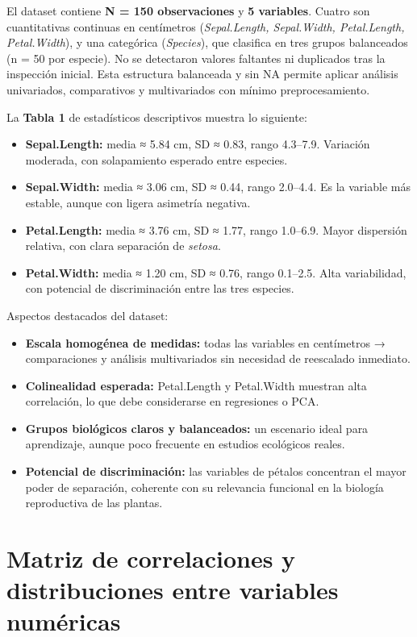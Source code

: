 \documentclass[
  spanish,
  11pt,
  a4paper,
  DIV=11,
  numbers=noendperiod]{scrartcl}
\begin{document}
El dataset contiene \textbf{N = 150 observaciones} y \textbf{5
variables}. Cuatro son cuantitativas continuas en centímetros
(\emph{Sepal.Length, Sepal.Width, Petal.Length, Petal.Width}), y una
categórica (\emph{Species}), que clasifica en tres grupos balanceados (n
= 50 por especie). No se detectaron valores faltantes ni duplicados tras
la inspección inicial. Esta estructura balanceada y sin NA permite
aplicar análisis univariados, comparativos y multivariados con mínimo
preprocesamiento.

La \textbf{Tabla 1} de estadísticos descriptivos muestra lo siguiente:

\begin{itemize}
\item
  \textbf{Sepal.Length:} media ≈ 5.84 cm, SD ≈ 0.83, rango 4.3--7.9.
  Variación moderada, con solapamiento esperado entre especies.
\item
  \textbf{Sepal.Width:} media ≈ 3.06 cm, SD ≈ 0.44, rango 2.0--4.4. Es
  la variable más estable, aunque con ligera asimetría negativa.
\item
  \textbf{Petal.Length:} media ≈ 3.76 cm, SD ≈ 1.77, rango 1.0--6.9.
  Mayor dispersión relativa, con clara separación de \emph{setosa}.
\item
  \textbf{Petal.Width:} media ≈ 1.20 cm, SD ≈ 0.76, rango 0.1--2.5. Alta
  variabilidad, con potencial de discriminación entre las tres especies.
\end{itemize}

Aspectos destacados del dataset:

\begin{itemize}
\item
  \textbf{Escala homogénea de medidas:} todas las variables en
  centímetros → comparaciones y análisis multivariados sin necesidad de
  reescalado inmediato.
\item
  \textbf{Colinealidad esperada:} Petal.Length y Petal.Width muestran
  alta correlación, lo que debe considerarse en regresiones o PCA.
\item
  \textbf{Grupos biológicos claros y balanceados:} un escenario ideal
  para aprendizaje, aunque poco frecuente en estudios ecológicos reales.
\item
  \textbf{Potencial de discriminación:} las variables de pétalos
  concentran el mayor poder de separación, coherente con su relevancia
  funcional en la biología reproductiva de las plantas.
\end{itemize}

\section{Matriz de correlaciones y distribuciones entre variables
numéricas}\label{matriz-de-correlaciones-y-distribuciones-entre-variables-numuxe9ricas}
\end{document}
